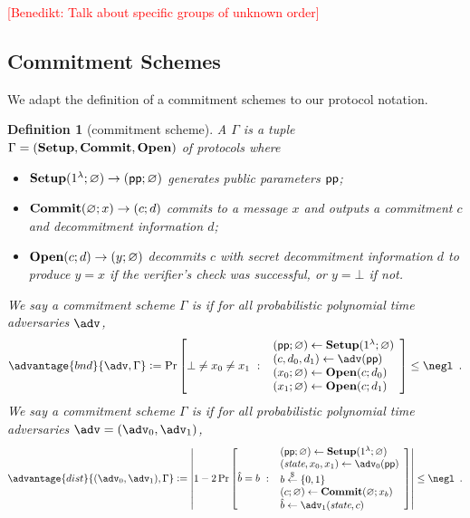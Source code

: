 \documentclass{article}
\newtheorem{definition}{Definition}
\newcommand{\benedikt}[1]{{\textcolor{red}{[Benedikt: #1]}}}
\newcommand{\benedikt}[1]{}
\begin{document}
\benedikt{Talk about specific groups of unknown order}


\subsection{Commitment Schemes}

We adapt the definition of a commitment schemes to our protocol notation.

\begin{definition}[commitment scheme]
A  $\Gamma$ is a tuple $\Gamma = (\textbf{{Setup}}, \textbf{{Commit}}, \textbf{{Open}})$ of protocols where
\begin{itemize}
    \item $\textbf{{Setup}}(1^\lambda; \varnothing) \rightarrow (\textsf{pp}; \varnothing)$ generates public parameters $\textsf{pp}$;
    \item $\textbf{{Commit}}(\varnothing; x) \rightarrow (c; d)$ commits to a message $x$ and outputs a commitment $c$ and decommitment information $d$;
    \item $\textbf{{Open}}(c;d) \rightarrow (y; \varnothing)$ decommits $c$ with secret decommitment information $d$ to produce $y = x$ if the verifier's check was successful, or $y = \bot$ if not.
\end{itemize}
We say a commitment scheme $\Gamma$ is  if for all probabilistic polynomial time adversaries $\adv$,
\[
    \advantage{bnd}{\adv, \Gamma} \deq 
    \Pr\left[
        \bot \neq x_0 \neq x_1 \ : \
        \begin{array}{l}
             (\params; \varnothing) \gets \pro{Setup}(1^\lambda; \varnothing ) \\
             (c, d_0, d_1) \gets \adv(\params) \\
             (x_0; \varnothing) \gets \pro{Open}(c; d_0) \\
             (x_1; \varnothing) \gets \pro{Open}(c; d_1) \\
        \end{array}
    \right] \leq \negl \enspace .
\]
We say a commitment scheme $\Gamma$ is  if for all probabilistic polynomial time adversaries $\adv=(\adv_0,\adv_1)$,
\[
    \advantage{dist}{(\adv_0, \adv_1), \Gamma} \deq
    \left|
        1 - 2\Pr\left[
            \hat{b} = b \ : \
        \begin{array}{l}
             (\params; \varnothing) \gets \pro{Setup}(1^\lambda; \varnothing ) \\
             (\state, x_0, x_1) \gets \adv_0(\params) \\
             b \sample \{0,1\} \\
             (c; \varnothing) \gets \pro{Commit}(\varnothing; x_b) \\
             \hat{b} \gets \adv_1(\state, c)
        \end{array}
        \right]
    \right| \leq \negl \enspace .
\]
\end{definition}
\end{document}
